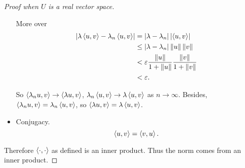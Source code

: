 \begin{proof}[Proof when $U$ is a real vector space]
\begin{itemize}
              More over
              \begin{align*}
                  \left\vert{\lambda\left\langle{u, v}\right\rangle - \lambda_{n}\left\langle{u, v}\right\rangle}\right\vert & = \left\vert{\lambda - \lambda_{n}}\right\vert\left\vert{\left\langle{u, v}\right\rangle}\right\vert                      \\
                                                                              & \leq \left\vert{\lambda - \lambda_{n}}\right\vert\left\Vert{u}\right\Vert\left\Vert{v}\right\Vert                         \\
                                                                              & < \varepsilon \frac{\left\Vert{u}\right\Vert}{1 + \left\Vert{u}\right\Vert}\frac{\left\Vert{v}\right\Vert}{1 + \left\Vert{v}\right\Vert} \\
                                                                              & < \varepsilon.
              \end{align*}

              So $\left\langle{\lambda_{n}u, v}\right\rangle\to \left\langle{\lambda u, v}\right\rangle$, $\lambda_{n}\left\langle{u, v}\right\rangle\to \lambda\left\langle{u, v}\right\rangle$ as $n\to\infty$. Besides, $\left\langle{\lambda_{n}u, v}\right\rangle = \lambda_{n}\left\langle{u, v}\right\rangle$, so $\left\langle{\lambda u, v}\right\rangle = \lambda\left\langle{u, v}\right\rangle$.
        \item Conjugacy.
              \[
                  \left\langle{u, v}\right\rangle = \left\langle{v, u}\right\rangle.
              \]
    \end{itemize}

    Therefore $\left\langle{\cdot, \cdot}\right\rangle$ as defined is an inner product. Thus the norm comes from an inner product.
\end{proof}

